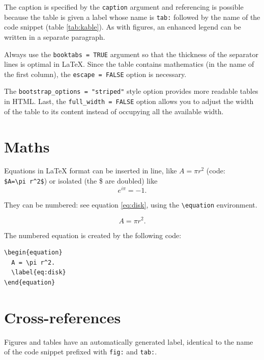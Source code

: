 \documentclass[
  12pt,
  american,
  a4paper,
  extrafontsizes,onecolumn,openright
  ]{memoir}
\begin{document}
\normalsize

The caption is specified by the \texttt{caption} argument and referencing is possible because the table is given a label whose name is \texttt{tab:} followed by the name of the code snippet (table \ref{tab:kable}).
As with figures, an enhanced legend can be written in a separate paragraph.

Always use the \texttt{booktabs\ =\ TRUE} argument so that the thickness of the separator lines is optimal in LaTeX.
Since the table contains mathematics (in the name of the first column), the \texttt{escape\ =\ FALSE} option is necessary.

The \texttt{bootstrap\_options\ =\ "striped"} style option provides more readable tables in HTML.
Last, the \texttt{full\_width\ =\ FALSE} option allows you to adjust the width of the table to its content instead of occupying all the available width.

\hypertarget{maths}{%
\section{Maths}\label{maths}}

Equations in LaTeX format can be inserted in line, like \(A=\pi r^2\) (code: \texttt{\$A=\textbackslash{}pi\ r\^{}2\$}) or isolated (the \$ are doubled) like \[e^{i \pi} = -1.\]

They can be numbered: see equation \eqref{eq:disk}, using the \texttt{\textbackslash{}equation} environment.

\begin{equation}
  A = \pi r^2.
  \label{eq:disk}
\end{equation}

The numbered equation is created by the following code:

\begin{verbatim}
\begin{equation}
  A = \pi r^2.
  \label{eq:disk}
\end{equation}
\end{verbatim}

\hypertarget{cross-references}{%
\section{Cross-references}\label{cross-references}}

Figures and tables have an automatically generated label, identical to the name of the code snippet prefixed with \texttt{fig:} and \texttt{tab:}.
\end{document}
